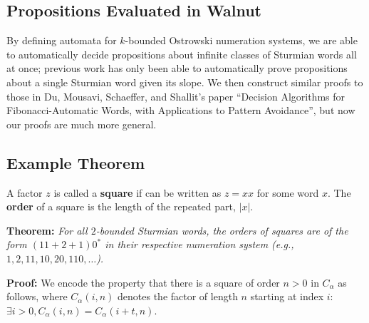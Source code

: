 \documentclass[landscape]{sciposter}
\newtheorem*{definition}{Definition}
\begin{document}
\begin{multicols}{3}
\section*{Propositions Evaluated in Walnut}

By defining automata for $k$-bounded Ostrowski numeration systems, we are able to automatically decide propositions about infinite classes of Sturmian words all at once; previous work has only been able to automatically prove propositions about a single Sturmian word given its slope.
We then construct similar proofs to those in Du, Mousavi, Schaeffer, and Shallit's paper ``Decision Algorithms for Fibonacci-Automatic Words, with Applications to Pattern Avoidance'', but now our proofs are much more general.



\begin{mdframed}[style=MyFrame]
\subsection*{Example Theorem}
\end{mdframed}

A factor $z$ is called a \textbf{square} if can be written as $z = xx$ for some word $x$.
The \textbf{order} of a square is the length of the repeated part, $|x|$.

\textbf{Theorem:} \emph{For all $2$-bounded Sturmian words, the orders of squares are of the form $(11+2+1)0^*$ in their respective numeration system (e.g., $1,2,11,10,20,110,\ldots$).}

\textbf{Proof:} We encode the property that there is a square of order $n > 0$ in $C_{\alpha}$ as follows, where $C_{\alpha}(i,n)$ denotes the factor of length $n$ starting at index $i$: $\exists i > 0, C_{\alpha}(i,n) = C_{\alpha}(i+t,n)$.


\end{multicols}
\end{document}
